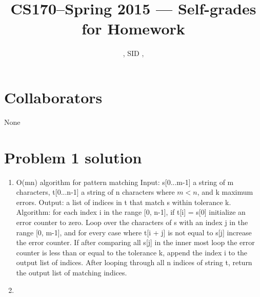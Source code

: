 \documentclass[11pt]{article}
\title{CS170--Spring 2015 --- Self-grades for Homework \Homework}
\author{\Name, SID \SID, \texttt{\Login}}
\date{}
\newenvironment{qparts}{\begin{enumerate}[{(}a{)}]}{\end{enumerate}}
\begin{document}
\maketitle

\section*{Collaborators} 
None

\newpage
\section*{Problem 1 solution}
\begin{qparts}
\item O(mn) algorithm for pattern matching\newline
Input: s[0...m-1] a string of m characters, t[0...n-1] a string of n characters where $m < n$, and k maximum errors.\newline
Output: a list of indices in t that match s within tolerance k. \newline
Algorithm: for each index i in the range [0, n-1], if t[i] = s[0] initialize an error counter to zero. Loop over the characters of s with an index j in the range [0, m-1], and for every case where t[i + j] is not equal to s[j] increase the error counter. If after comparing all s[j] in the inner most loop the error counter is less than or equal to the tolerance k, append the index i to the output list of indices. After looping through all n indices of string t, return the output list of matching indices.
\item

\end{qparts}

\newpage
\end{document}
